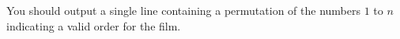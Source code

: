 You should output a single line containing a permutation of the numbers $1$ to $n$
indicating a valid order for the film.